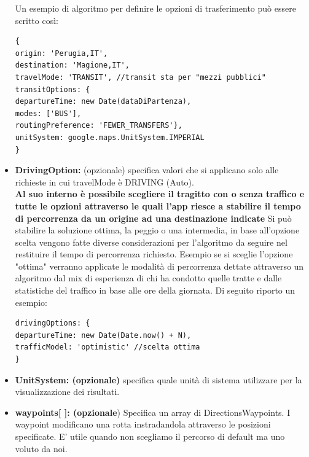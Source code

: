 \documentclass[]{scrartcl}
\begin{document}
\begin{itemize}
Un esempio di algoritmo per definire le opzioni di trasferimento può essere scritto così:
\begin{lstlisting}[frame=trBL]
{
origin: 'Perugia,IT',
destination: 'Magione,IT',
travelMode: 'TRANSIT', //transit sta per "mezzi pubblici"
transitOptions: {
departureTime: new Date(dataDiPartenza),
modes: ['BUS'],
routingPreference: 'FEWER_TRANSFERS'},
unitSystem: google.maps.UnitSystem.IMPERIAL
}
\end{lstlisting} 

\item{\textbf{DrivingOption:} }(opzionale) specifica valori che si applicano solo alle richieste in cui travelMode è DRIVING (Auto). \\ \textbf{Al suo interno è possibile scegliere il tragitto con o senza traffico e tutte le opzioni attraverso le quali l'app riesce a stabilire il tempo di percorrenza da un origine ad una destinazione indicate}
Si può stabilire la soluzione ottima, la peggio o una intermedia, in base all'opzione scelta vengono fatte diverse considerazioni per l'algoritmo da seguire nel restituire il tempo di percorrenza richiesto. Esempio se si sceglie l'opzione "ottima" verranno applicate le modalità di percorrenza dettate attraverso un algoritmo dal mix di esperienza di chi ha condotto quelle tratte e dalle statistiche del traffico in base alle ore della giornata. Di seguito riporto un esempio:
\begin{lstlisting}[frame=trBl]
drivingOptions: {
departureTime: new Date(Date.now() + N),
trafficModel: 'optimistic' //scelta ottima 
}
\end{lstlisting}
\item \textbf{UnitSystem: (opzionale)} specifica quale unità di sistema utilizzare per la visualizzazione dei risultati.
\item \textbf{waypoints[ ]: (opzionale}) Specifica un array di DirectionsWaypoints. I waypoint modificano una rotta instradandola attraverso le posizioni specificate. E' utile quando non scegliamo il percorso di default ma uno voluto da noi.  
\end{itemize}
\end{document}
